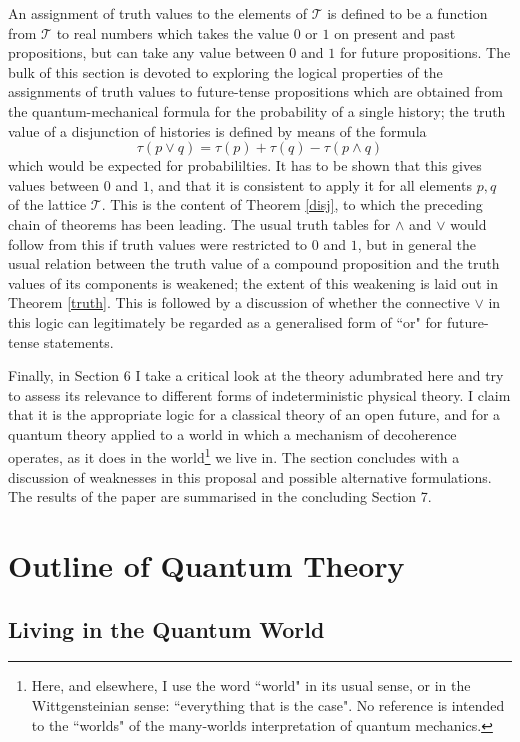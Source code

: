 \documentclass[12pt,reqno]{article}
\renewcommand{\(}{\left(}
\renewcommand{\)}{\right)}
\newcommand{\T}{\mathcal{T}}
\newcommand{\<}{\langle}
\renewcommand{\>}{\rangle}
\theoremstyle{plain} %
\begin{document}
An assignment of truth values to the elements of $\T$ is defined to be a function from $\T$ to real numbers which takes the value $0$ or $1$ on present and past propositions, but can take any value between $0$ and $1$ for future propositions. The bulk of this section is devoted to exploring the logical properties of the assignments of truth values to future-tense propositions which are obtained from the quantum-mechanical formula for the probability of a single history; the truth value of a disjunction of histories is defined by means of the formula
\[
\tau(p\lor q) = \tau(p) + \tau(q) - \tau(p\land q)
\]
which would be expected for probabililties. It has to be shown that this gives values between $0$ and $1$, and that it is consistent to apply it for all elements $p,q$ of the lattice $\T$. This is the content of Theorem \ref{disj}, to which the preceding chain of theorems has been leading. The usual truth tables for $\land$ and $\lor$ would follow from this if truth values were restricted to $0$ and $1$, but in general the usual relation between the truth value of a compound proposition and the truth values of its components is weakened; the extent of this weakening is laid out in Theorem \ref{truth}. This is followed by a discussion of whether the connective $\lor$ in this logic can legitimately be regarded as a generalised form of ``or" for future-tense statements.

Finally, in Section 6 I take a critical look at the theory adumbrated here and try to assess its relevance to different forms of indeterministic physical theory. I claim that it is the appropriate logic for a classical theory of an open future, and for a quantum theory applied to a world in which a mechanism of decoherence operates, as it does in the world\footnote{Here, and elsewhere, I use the word ``world" in its usual sense, or in the Wittgensteinian sense: ``everything that is the case". No reference is intended to the ``worlds" of the many-worlds interpretation of quantum mechanics.} we live in. The section concludes with a discussion of weaknesses in this proposal and possible alternative formulations. The results of the paper are summarised in the concluding Section 7.

\section{Outline of Quantum Theory}
\label{sec:quantum}

\subsection{Living in the Quantum World}
\label{subsec:qworld}
\end{document}

